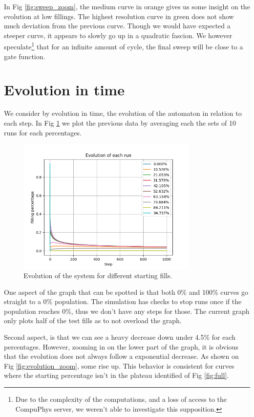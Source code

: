\documentclass{article}
\begin{document}
In Fig \ref*{fig:sweep_zoom}, the medium curve in orange gives us some insight on the evolution
at low fillings. The highest resolution curve in green does not show much deviation
from the previous curve. Though we would have expected a steeper curve, it appears to slowly go up
in a quadratic fascion. We however speculate\footnote[1]{Due to the complexity of the computations, and a loss of access
to the CompuPhys server, we weren't able to investigate this supposition.} that for an infinite amount of cycle, the final sweep will be 
close to a gate function. 



\section{Evolution in time}
We consider by evolution in time, the evolution of the automaton in relation to each step.
In Fig \ref*{fig:full_evolution} we plot the previous data by averaging each the sets of 
10 runs for each percentages.

\begin{figure}[htbp]
    \centering
    \includegraphics[width=0.8\textwidth]{res/Full_evolution.png}
    \caption{Evolution of the system for different starting fills.}
    \label{fig:full_evolution}
\end{figure}

One aspect of the graph that can be spotted is that both 0\% and 100\% curves go 
straight to a 0\% population. The simulation has checks to stop runs
once if the population reaches 0\%, thus we don't have any steps for those.
The current graph only plots half of the test fills as to not overload the graph.

Second aspect, is that we can see a heavy decrease down under 4.5\% for each percentages.
However, zooming in on the lower part of the graph, it is obvious that the evolution 
does not always follow a exponential decrease. As shown on Fig \ref*{fig:evolution_zoom}, some rise up.
This behavior is consistent for curves where the starting percentage isn't in the plateau identified
of Fig \ref*{fig:full}.
\end{document}
